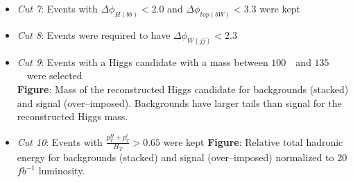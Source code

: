 \begin{frame}{}
\vspace{-.2cm}

\begin{columns}
\begin{column}{.50\textwidth}
\begin{block}{}
\begin{itemize}\scriptsize
\item \textit{Cut 7}: Events with $\Delta \phi_{H(bb)}<2.0$ and $\Delta \phi_{top(bW)}<3.3$ were kept
\item \textit{Cut 8}: Events were required to have $\Delta \phi_{W(jj)}<2.3$ 
\item \textit{Cut 9}: Events with a Higgs candidate with a mass between $100$~\GeVcc~and $135$~\GeVcc~were selected\\
\textbf{Figure}: Mass of the reconstructed Higgs candidate for backgrounds (stacked) and signal (over--imposed). Backgrounds have larger tails than signal for the reconstructed Higgs mass.
\item \textit{Cut 10}: Events with $\frac{p_{T}^{H}+p_{T}^{t}}{H_{T}}>0.65$ were kept
\textbf{Figure}: Relative total hadronic energy for backgrounds (stacked) and signal (over--imposed) normalized to 20 $fb^{-1}$ luminosity.
\end{itemize}
\end{block}
\end{column}


\end{columns}
\end{frame}
